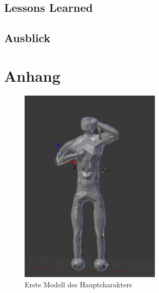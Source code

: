 \documentclass[12pt]{article}
\begin{document}
\vspace{2cm}
\subsection{Lessons Learned}

\vspace{2cm}
\subsection{Ausblick}

\section{Anhang}

\begin{figure}
	\centering
	\includegraphics[width=0.6\textwidth]{lowPoly}
	\caption{Erste Modell des Hauptcharakters
		\label{fig:lowpoly}}
\end{figure}
\end{document}
